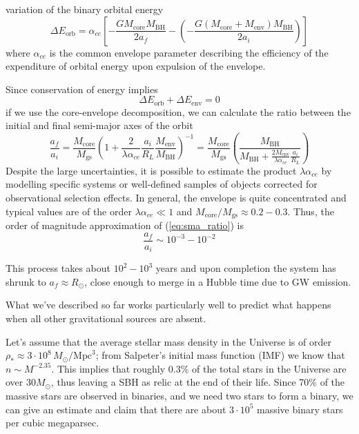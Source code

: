 variation of the binary orbital energy
\begin{equation}
    \Delta E_{\text{orb}} = \alpha_{ce}\left[-\frac{GM_{\text{core}}M_{\text{BH}}}{2a_{f}}-\left(-\frac{G(M_{\text{core}}+M_{\text{env}})M_{\text{BH}}}{2a_{i}}\right)\right]
    \label{eq:boe_var}
\end{equation}
where $\alpha_{ce}$ is the common envelope parameter describing the efficiency of the expenditure of orbital energy upon expulsion of the envelope.
\par Since conservation of energy implies 
\begin{equation*}
    \Delta E_{\text{orb}}+\Delta E_{\text{env}} = 0
\end{equation*}
if we use the core-envelope decomposition, we can calculate the ratio between the initial and final semi-major axes of the orbit 
\begin{equation}
    \frac{a_{f}}{a_{i}} = \frac{M_{\text{core}}}{M_{\text{gs}}}\left(1+\frac{2}{\lambda\alpha_{ce}}\frac{a_{i}}{R_{L}}\frac{M_{\text{env}}}{M_{\text{BH}}}\right)^{-1} = \frac{M_{\text{core}}}{M_{\text{gs}}}\left(\frac{M_{\text{BH}}}{M_{\text{BH}} + \frac{2M_{\text{env}}}{\lambda\alpha_{ce}}\frac{a_{i}}{R_{L}}}\right)
    \label{eq:sma_ratio}
\end{equation}
Despite the large uncertainties, it is possible to estimate the product $\lambda\alpha_{ce}$ by modelling speciﬁc systems or well-deﬁned samples of objects corrected for observational selection eﬀects. In general, the envelope is quite concentrated and typical values are of the order $\lambda\alpha_{ce}\ll 1$ and $M_{\text{core}}/M_{\text{gs}} \approx 0.2-0.3$. Thus, the order of magnitude approximation of (\ref{eq:sma_ratio}) is 
\begin{equation*}
    \frac{a_{f}}{a_{i}} \sim 10^{-3}-10^{-2}
\end{equation*}
\par This process takes about $10^{2}-10^{3}$ years and upon completion the system has shrunk to $a_{f}\approx R_{\odot}$, close enough to merge in a Hubble time due to GW emission.
\par What we've described so far works particularly well to predict what happens when all other gravitational sources are absent.
\par Let's assume that the average stellar mass density in the Universe is of order $\rho_{*} \approx 3\cdot10^{8}\,M_{\odot}/\text{Mpc}^{3}$; from Salpeter's initial mass function (IMF) we know that $n\sim M^{-2.35}$. This implies that roughly 0.3\% of the total stars in the Universe are over $30M_{\odot}$, thus leaving a SBH as relic at the end of their life. Since 70\% of the massive stars are observed in binaries, and we need two stars to form a binary, we can give an estimate and claim that there are about $3\cdot 10^{5}$ massive binary stars per cubic megaparsec.
